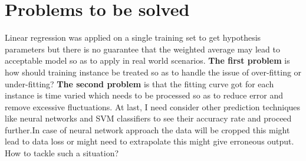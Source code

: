 \documentclass[10pt,a4paper]{article}
\begin{document}
\section{Problems to be solved}
\begin{normalsize}
Linear regression was applied on a single training set to get hypothesis parameters but there is no guarantee that the weighted average may lead to acceptable model so as to apply in real world scenarios. \textbf{The first problem} is how should training instance be treated so as to handle the issue of over-fitting or under-fitting? \textbf{The second problem} is that the fitting curve got for each instance is time varied which needs to be processed so as to reduce error and remove excessive fluctuations.
At last, I need consider other prediction techniques like neural networks and SVM classifiers to see their accuracy rate and proceed further.In case of neural network approach the data will be cropped this might lead to data loss or might need to extrapolate this might give erroneous output. How to tackle such a situation?


\end{normalsize}




\end{document}
